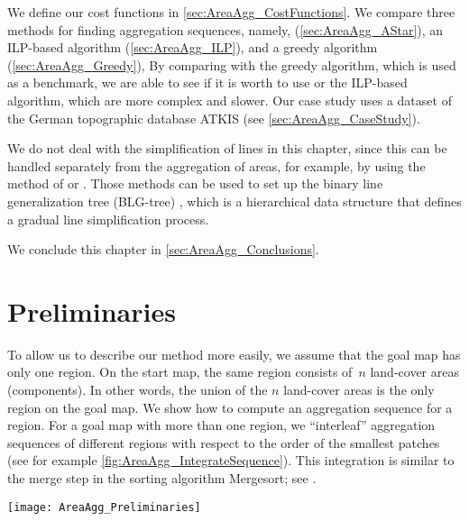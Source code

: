 We define our cost functions in \sect\ref{sec:AreaAgg_CostFunctions}.
We compare three methods for finding aggregation sequences, namely,
\Astar (\sect\ref{sec:AreaAgg_AStar}), 
an ILP-based algorithm (\sect\ref{sec:AreaAgg_ILP}), and
a greedy algorithm (\sect\ref{sec:AreaAgg_Greedy}), 
By comparing with the greedy algorithm, 
which is used as a benchmark,
we are able to see if it is worth 
to use \Astar or the ILP-based algorithm, 
which are more complex and slower.  Our case study 
uses a dataset of the German topographic database ATKIS 
(see \sect\ref{sec:AreaAgg_CaseStudy}).  

We do not deal with the simplification of lines in this chapter, 
since this can be handled separately from the
aggregation of areas, for example, 
by using the method of \citet{Douglas1973} 
or \citet{Saalfeld1999}.
Those methods can be used to set up 
the binary line generalization tree (BLG-tree)
\citep{vanOosterom1995Development},
which is a hierarchical data structure that 
defines a gradual line simplification process.

We conclude this chapter in \sect\ref{sec:AreaAgg_Conclusions}.

\section{Preliminaries}
\label{sec:AreaAgg_Preliminaries}


To allow us to describe our method more easily,
we assume that the goal map has only one region. 
On the start map, the same region consists of~$n$ land-cover 
areas (components). 
In other words, the union of the $n$ land-cover areas 
is the only region on the goal map.  
We show how to compute an aggregation sequence for a region. 
For a goal map with more than one region, 
we ``interleaf'' aggregation sequences of different regions
with respect to the order of the smallest patches 
(see for example \fig\ref{fig:AreaAgg_IntegrateSequence}).
This integration is similar to the merge step in the 
sorting algorithm Mergesort; 
see \textcite[pp.~29--37]{Cormen2009}.
\begin{figure*}[tb]
	\centering
	\texttt{[image: AreaAgg\_Preliminaries]}
	\caption{Integrating two aggregation sequences of different 
		regions: the resulting sequence contains the given 
		sequences as
		subsequences and always takes the subdivision with 
		smallest
		patch next}
	\label{fig:AreaAgg_IntegrateSequence}
\end{figure*}


